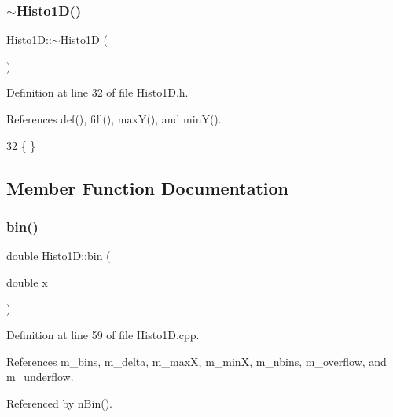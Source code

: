 \subsubsection{\texorpdfstring{$\sim$\+Histo1\+D()}{~Histo1D()}}
{\footnotesize\ttfamily Histo1\+D\+::$\sim$\+Histo1D (\begin{DoxyParamCaption}{ }\end{DoxyParamCaption})\hspace{0.3cm}{\ttfamily [inline]}}



Definition at line 32 of file Histo1\+D.\+h.



References def(), fill(), max\+Y(), and min\+Y().


\begin{DoxyCode}
32 \{ \}
\end{DoxyCode}


\subsection{Member Function Documentation}
\mbox{\label{classHisto1D_a2a8a7d93c2f10b73b490a6f550e00db4}} 
\subsubsection{\texorpdfstring{bin()}{bin()}}
{\footnotesize\ttfamily double Histo1\+D\+::bin (\begin{DoxyParamCaption}\item[{double}]{x }\end{DoxyParamCaption})}



Definition at line 59 of file Histo1\+D.\+cpp.



References m\+\_\+bins, m\+\_\+delta, m\+\_\+maxX, m\+\_\+minX, m\+\_\+nbins, m\+\_\+overflow, and m\+\_\+underflow.



Referenced by n\+Bin().


